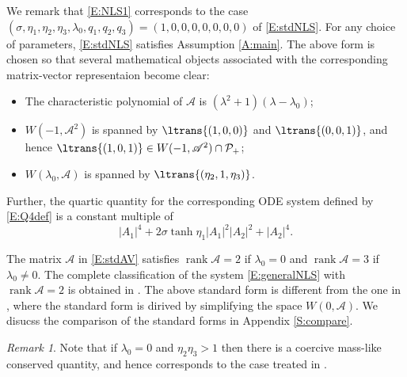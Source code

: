 \documentclass[11pt,a4paper,oneside]{amsart}
\theoremstyle{plain}
\theoremstyle{remark}
\newtheorem{remark}[theorem]{Remark}
\numberwithin{equation}{section}
\DeclareMathOperator{\rank}{rank}
\theoremstyle{definition}
\begin{document}
We remark that \eqref{E:NLS1} corresponds to the case
$(\sigma,\eta_1,\eta_2,\eta_3,\lambda_0,q_1,q_2,q_3)=(1,0,0,0,0,0,0,0)$ of \eqref{E:stdNLS}.
For any choice of parameters, \eqref{E:stdNLS} satisfies Assumption \ref{A:main}.
The above form is chosen so that several mathematical objects associated with the corresponding matrix-vector representaion become clear:
\begin{itemize}
\item
The characteristic polynomial of $\mathscr{A}$ 
is $(\lambda^2+1)(\lambda- \lambda_0)$;
\item
$W(-1,\mathscr{A}^2)$ is spanned by $\ltrans{(1,0,0)}$ and $\ltrans{(0,0,1)}$, and hence $\ltrans{(1,0,1)} \in W(-1,\mathscr{A}^2) \cap \mathcal{P}_+$;
\item $W(\lambda_0,\mathscr{A})$ is spanned by $\ltrans{(\eta_2,1,\eta_3)}$.
\end{itemize}
Further, the quartic quantity for the corresponding ODE system defined by \eqref{E:Q4def} is a constant multiple of
\begin{equation}\label{E:stdQQ}
	 |A_1|^4 + 2\sigma \tanh \eta_1 |A_1|^2|A_2|^2 + |A_2|^4.
\end{equation}


The matrix $\mathscr{A}$ in \eqref{E:stdAV} satisfies
$\rank \mathscr{A} = 2$ if $\lambda_0=0$ and $\rank \mathscr{A}=3$ if $\lambda_0\neq0$.
The complete classification of the system \eqref{E:generalNLS} with $\rank \mathscr{A}=2$ is obtained in \cite{M}.
The above standard form is different from the one in \cite{M}, where the standard form is dirived by simplifying the space $W(0,\mathscr{A})$.
We disucss the comparison of
the standard forms in Appendix \ref{S:compare}.
\begin{remark}
Note that if $\lambda_0=0$
and $\eta_2\eta_3>1$ then there is a coercive mass-like conserved quantity, and hence corresponds to the case treated in \cite{LS,KS,M2}.
\end{remark}
\end{document}
